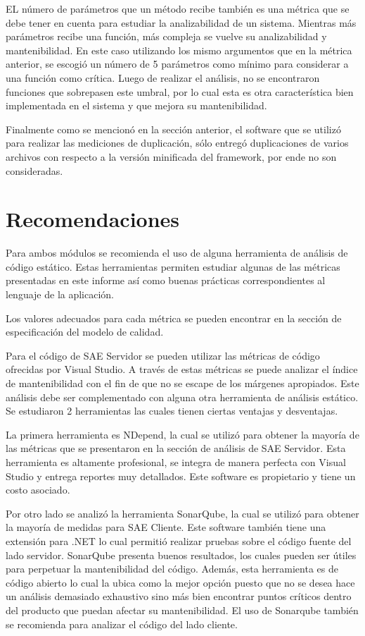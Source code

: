 EL número de parámetros que un método recibe también es una métrica que se debe 
tener en cuenta para estudiar la analizabilidad de un sistema. Mientras más 
parámetros recibe una función, más compleja se vuelve su analizabilidad y 
mantenibilidad. En este caso utilizando los mismo argumentos que en la métrica 
anterior, se escogió un número de 5 parámetros como mínimo para considerar a 
una función como crítica. Luego de realizar el análisis, no se encontraron 
funciones que sobrepasen este umbral, por lo cual esta es otra característica 
bien implementada en el sistema y que mejora su mantenibilidad.

Finalmente como se mencionó en la sección anterior, el software que se utilizó 
para realizar las mediciones de duplicación, sólo entregó duplicaciones de 
varios archivos con respecto a la versión minificada del framework, por ende 
no son consideradas.

\section{Recomendaciones}

Para ambos módulos se recomienda el uso de alguna herramienta de análisis 
de código estático. Estas herramientas permiten estudiar algunas de las métricas 
presentadas en este informe así como buenas prácticas correspondientes al 
lenguaje de la aplicación.

Los valores adecuados para cada métrica se pueden encontrar en la 
sección de especificación del modelo de calidad.

Para el código de SAE Servidor se pueden utilizar las métricas de código 
ofrecidas por Visual Studio. A través de estas métricas se puede analizar el 
índice de mantenibilidad con el fin de que no se escape de los márgenes 
apropiados. Este análisis debe ser complementado con alguna otra herramienta 
de análisis estático. Se estudiaron 2 herramientas las cuales tienen ciertas 
ventajas y desventajas. 

La primera herramienta es NDepend, la cual se utilizó para obtener la mayoría 
de las métricas que se presentaron en la sección de análisis de SAE Servidor. 
Esta herramienta es altamente profesional, se integra de manera perfecta con 
Visual Studio y entrega reportes muy detallados. Este software es propietario 
y tiene un costo asociado.

Por otro lado se analizó la herramienta SonarQube, la cual se utilizó para 
obtener la mayoría de medidas para SAE Cliente. Este software también tiene 
una extensión para .NET lo cual permitió realizar pruebas sobre el código 
fuente del lado servidor.
SonarQube presenta buenos resultados, los cuales pueden ser útiles para 
perpetuar la mantenibilidad del código. Además, esta herramienta es de código 
abierto lo cual la ubica como la mejor opción puesto que no se desea hace un 
análisis demasiado exhaustivo sino más bien encontrar puntos críticos dentro 
del producto que puedan afectar su mantenibilidad. El uso de Sonarqube también 
se recomienda para analizar el código del lado cliente.



